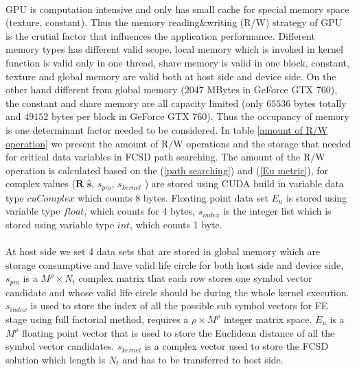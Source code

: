 \documentclass[12pt,a4paper,final]{article}
\begin{document}
\begin{spacing}{2.5}
\paragraph{}GPU is computation intensive and only has small cache for special memory space (texture, constant). Thus the memory reading$\&$writing (R/W) strategy of GPU is the crutial factor that influences the application performance. Different memory types has different valid scope, local memory which is invoked in kernel function is valid only in one thread, share memory is valid in one block, constant, texture and global memory are valid both at host side and device side. On the other hand different from global memory (2047 MBytes in GeForce GTX 760), the constant and share memory are all capacity limited (only $65536$ bytes totally and $49152$ bytes per block in GeForce GTX 760). Thus the occupancy of memory is one determinant factor needed to be considered. In table \ref{amount of R/W operation} we present the amount of R/W operations and the storage that needed for critical data variables in FCSD path searching. The amount of the R/W operation is calculated based on the (\ref{path searching}) and (\ref{Eu metric}), for complex values ($\mathbf{R}$ $\mathbf{\hat{s}}$, $\mathit{s_{pm}}$, $\mathit{s_{kernel}}$ ) are stored using CUDA build in variable data type $\mathit{cuComplex}$ which counts 8 bytes. Floating point data set $E_{u}$ is stored using variable type $\mathit{float}$, which counts for 4 bytes, $\mathit{s_{index}}$ is the integer list which is stored using variable type $\mathit{int}$, which counts 1 byte.\\
 \paragraph{}At host side we set 4 data sets that are stored in global memory which are storage consumptive and have valid life circle for both host side and device side, $\mathit{s_{pm}}$ is a $M^{\rho}\times N_{t}$ complex matrix that each row stores one symbol vector candidate and whose valid life circle should be during the whole kernel execution. $\mathit{s_{index}}$ is used to store the index of all the possible sub symbol vectors for  FE stage using full factorial method, requires a $\rho\times M^{\rho}$  integer matrix space.  $\mathit{E_{u}}$ is a $M^{\rho}$ floating point vector that is used to store the Euclidean distance of all the symbol vector candidates. $\mathit{s_{kernel}}$ is a complex vector used to store the FCSD solution which length is $N_{t}$ and has to be transferred to host side. \\

\end{spacing}
\end{document}
